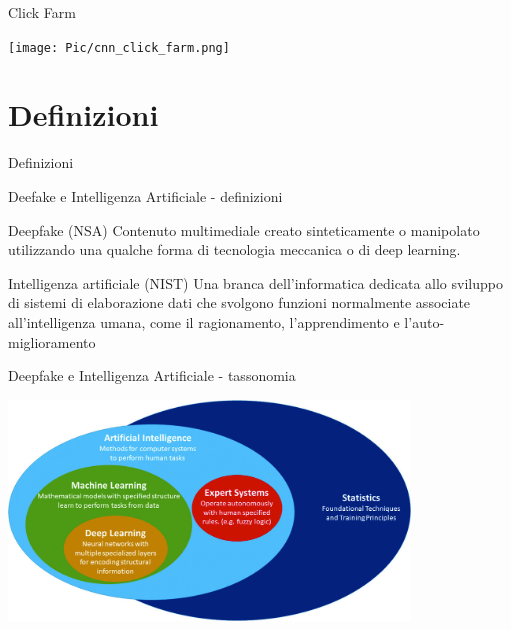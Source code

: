 \documentclass[11pt]{beamer}
\begin{document}
\begin{frame}{Click Farm \cite{clickfarm}}

\begin{center}
\texttt{[image: Pic/cnn\_click\_farm.png]}
\end{center}

\end{frame}



\section{Definizioni}

\begin{frame}
\begin{center}
\Huge
Definizioni
\end{center}
\end{frame}

\begin{frame}{Deefake e Intelligenza Artificiale - definizioni}

\begin{alertblock}{Deepfake (NSA) \cite{nsa_definition}}
Contenuto multimediale creato sinteticamente o manipolato utilizzando una qualche forma di tecnologia meccanica o di deep learning.
\end{alertblock}

\begin{alertblock}{Intelligenza artificiale (NIST) \cite{nist_definitioN_AI}}
Una branca dell'informatica dedicata allo sviluppo di sistemi di elaborazione dati che svolgono funzioni normalmente associate all'intelligenza umana, come il ragionamento, l'apprendimento e l'auto-miglioramento
\end{alertblock}

\end{frame}

\begin{frame}{Deepfake e Intelligenza Artificiale - tassonomia \cite{tassonomia}}

\begin{center}
\includegraphics[width=0.8\textwidth]{Pic/IA_classification.jpg}
\end{center}

\end{frame}
\end{document}
